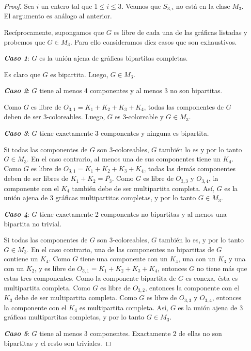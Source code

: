 \begin{proof}
Sea $i$ un entero tal que $1\le i \le 3$. Veamos que $S_{3,i}$ no está en la clase $M_3$. El argumento es análogo al anterior.

Recíprocamente, supongamos que $G$ es libre de cada una de las gráficas listadas y probemos que $G\in M_3$.  Para ello consideramos diez casos que son exhaustivos.
   
\emph{\textbf{Caso 1}}: $G$ es la unión ajena de gráficas bipartitas completas. 

Es claro que $G$ es bipartita. Luego, $G\in M_3$.

\emph{\textbf{Caso 2}}: $G$ tiene al menos 4 componentes y al menos 3 no son bipartitas.

Como $G$ es libre de $O_{3,1}=K_1+K_2+K_3+K_4$, todas las componentes de $G$ deben de ser 3-coloreables. Luego, $G$ es 3-coloreable y $G\in M_3$.

\emph{\textbf{Caso 3}}: $G$ tiene exactamente 3 componentes y ninguna es bipartita.

Si todas las componentes de $G$ son 3-coloreables, $G$ también lo es y por lo tanto $G\in M_3$. En el caso contrario, al menos una de sus componentes tiene un $K_4$. Como $G$ es libre de $O_{3,1}=K_1+K_2+K_3+K_4$, todas las demás componentes deben de ser libres de $K_1+K_2=\overline{P_3}$. Como $G$ es libre de $O_{3,3}$ y $O_{3,4}$, la componente con el $K_4$ también debe de ser multipartita completa. Así, $G$ es la unión ajena de 3 gráficas multipartitas completas, y por lo tanto $G\in M_3$.

\emph{\textbf{Caso 4}}: $G$ tiene exactamente 2 componentes no bipartitas y al menos una bipartita no trivial.

Si todas las componentes de $G$ son 3-coloreables, $G$ también lo es, y por lo tanto $G\in M_3$. En el caso contrario, una de las componentes no bipartitas de $G$ contiene un $K_4$. Como $G$ tiene una componente con un $K_4$, una con un $K_3$ y una con un $K_2$, y es libre de $O_{3,1}=K_1+K_2+K_3+K_4$, entonces $G$ no tiene más que estas tres componentes. Como la componente bipartita de $G$ es conexa, ésta es multipartita completa. Como $G$ es libre de $O_{3,2}$, entonces la componente con el $K_3$ debe de ser multipartita completa. Como $G$ es libre de $O_{3,3}$ y $O_{3,4}$, entonces la componente con el $K_4$ es multipartita completa. Así, $G$ es la unión ajena de 3 gráficas multipartitas completas, y por lo tanto $G\in M_3$.

\emph{\textbf{Caso 5}}: $G$ tiene al menos 3 componentes. Exactamente 2 de ellas no son bipartitas y el resto son triviales.


\end{proof}
